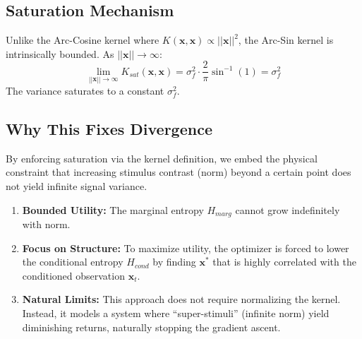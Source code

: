 \documentclass[11pt]{article}
\newcommand{\bx}{\mathbf{x}}
\begin{document}
\subsection{Saturation Mechanism}
Unlike the Arc-Cosine kernel where $K(\bx, \bx) \propto ||\bx||^2$, the Arc-Sin kernel is intrinsically bounded.
As $||\bx|| \to \infty$:
\begin{equation}
    \lim_{||\bx|| \to \infty} K_{sat}(\bx, \bx) = \sigma_f^2 \cdot \frac{2}{\pi} \sin^{-1}(1) = \sigma_f^2
\end{equation}
The variance saturates to a constant $\sigma_f^2$.

\subsection{Why This Fixes Divergence}
By enforcing saturation via the kernel definition, we embed the physical constraint that increasing stimulus contrast (norm) beyond a certain point does not yield infinite signal variance.

\begin{enumerate}
    \item \textbf{Bounded Utility:} The marginal entropy $H_{marg}$ cannot grow indefinitely with norm.
    \item \textbf{Focus on Structure:} To maximize utility, the optimizer is forced to lower the conditional entropy $H_{cond}$ by finding $\bx^*$ that is highly correlated with the conditioned observation $\bx_t$.
    \item \textbf{Natural Limits:} This approach does not require normalizing the kernel. Instead, it models a system where ``super-stimuli'' (infinite norm) yield diminishing returns, naturally stopping the gradient ascent.
\end{enumerate}
\end{document}
